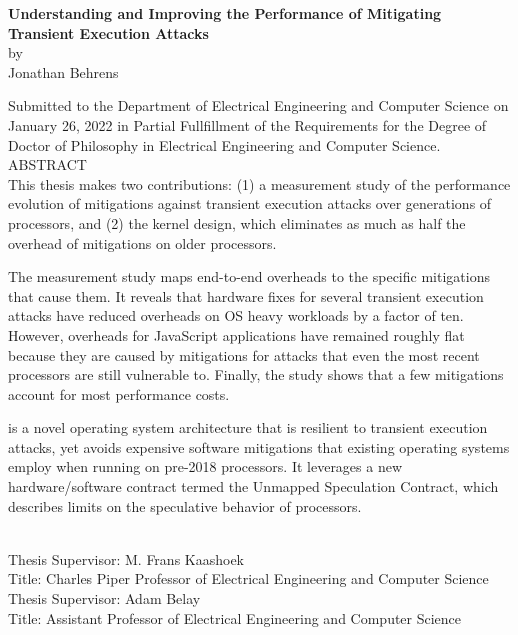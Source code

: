 
\singlespace
\begin{center}

{\large \bf Understanding and Improving the Performance of Mitigating Transient Execution Attacks} \\[.5\baselineskip]
by \\
Jonathan Behrens \\[.5\baselineskip]
\end{center}

Submitted to the Department of Electrical Engineering and Computer Science on January 26, 2022 in Partial Fullfillment of the Requirements for the Degree of Doctor of Philosophy in Electrical Engineering and Computer Science.\\[.5\baselineskip]

\noindent
ABSTRACT \\

This thesis makes two contributions:
(1) a measurement study of the performance evolution of mitigations against transient execution attacks over generations of processors, and (2) the \sys kernel design, which eliminates as much as half the overhead of mitigations on older processors.

The measurement study maps end-to-end overheads to the specific mitigations that cause them.
It reveals that hardware fixes for several transient execution attacks have reduced overheads on OS heavy workloads by a factor of ten.
However, overheads for JavaScript applications have remained roughly flat because they are caused by mitigations for attacks that even the most recent processors are still vulnerable to.
Finally, the study shows that a few mitigations account for most performance costs.


\sys is a novel operating system architecture that is resilient to transient execution attacks, yet avoids expensive software mitigations that existing operating systems employ when running on pre-2018 processors.
It leverages a new hardware/software contract termed the Unmapped Speculation Contract, which describes limits on the speculative behavior of processors.

~\\[\baselineskip]

\noindent
Thesis  Supervisor:  M.  Frans  Kaashoek \\
Title:  Charles  Piper  Professor  of Electrical  Engineering  and  Computer  Science \\[.5\baselineskip]
\noindent
Thesis  Supervisor:  Adam Belay \\
Title:  Assistant Professor  of Electrical  Engineering  and  Computer  Science \\

\doublespace